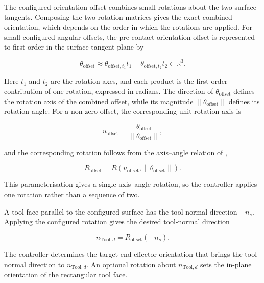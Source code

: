 The configured orientation offset combines small rotations about the two
surface tangents. Composing the two rotation matrices gives the exact combined
orientation, which depends on the order in which the rotations are applied. For
small configured angular offsets, the pre-contact orientation offset is
represented to first order in the surface tangent plane by

\begin{equation}
\theta_{\mathrm{offset}}
\approx
\theta_{\mathrm{offset},t_1}t_1+\theta_{\mathrm{offset},t_2}t_2
\in\mathbb{R}^{3}.
\label{eq:implementation_tilt_rotation_vector}
\end{equation}

Here \mbox{\(t_1\)} and \mbox{\(t_2\)} are the rotation axes, and each product
is the first-order contribution of one rotation, expressed in radians. The
direction of \mbox{\(\theta_{\mathrm{offset}}\)} defines the rotation axis of
the combined offset, while its magnitude
\mbox{\(\lVert\theta_{\mathrm{offset}}\rVert\)} defines its rotation angle. For a non-zero offset, the corresponding unit rotation axis is

\begin{equation}
u_{\mathrm{offset}}
=
\frac{\theta_{\mathrm{offset}}}
     {\lVert\theta_{\mathrm{offset}}\rVert},
\label{eq:implementation_offset_rotation_axis}
\end{equation}

and the corresponding rotation follows from the axis--angle relation of
\mbox{},

\[
R_{\mathrm{offset}}
=
R\!\left(u_{\mathrm{offset}},
\lVert\theta_{\mathrm{offset}}\rVert\right).
\]

This parameterisation gives a single axis--angle rotation, so the controller
applies one rotation rather than a sequence of two.

A tool face parallel to the configured surface has the tool-normal direction
\mbox{\(-n_s\)}. Applying the configured rotation gives the desired tool-normal
direction

\begin{equation}
n_{\mathrm{Tool},d}=R_{\mathrm{offset}}(-n_s).
\label{eq:implementation_tool_normal_target}
\end{equation}

The controller determines the target end-effector orientation that brings the
tool-normal direction to \mbox{\(n_{\mathrm{Tool},d}\)}. An optional rotation
about \mbox{\(n_{\mathrm{Tool},d}\)} sets the in-plane orientation of the
rectangular tool face.

